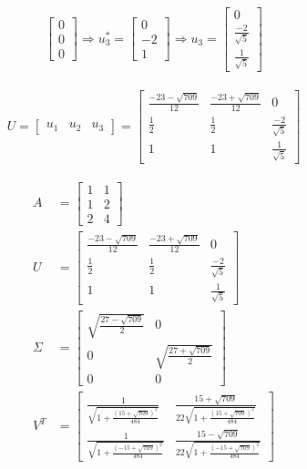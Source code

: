 \documentclass[a4paper, spanish]{article}
\begin{document}
\begin{align}
\begin{bmatrix}
        0 \\
        0 \\
        0
      \end{bmatrix}
      \Rightarrow
      u_3^* =
      \begin{bmatrix}
        0 \\
        -2 \\
        1
      \end{bmatrix}
      \Rightarrow
      u_3 =
      \begin{bmatrix}
        0 \\
        \frac{-2}{\sqrt{5}} \\
        \frac{1}{\sqrt{5}}
      \end{bmatrix}
    \end{align}

    \begin{align}
      U =
      \begin{bmatrix}
        u_1 & u_2 & u_3
      \end{bmatrix} =
      \begin{bmatrix}
        \frac{-23-\sqrt{709}}{12} & \frac{-23+\sqrt{709}}{12} & 0 \\
        \frac{1}{2} & \frac{1}{2} & \frac{-2}{\sqrt{5}} \\
        1 & 1 & \frac{1}{\sqrt{5}}
      \end{bmatrix}
    \end{align}


    \begin{align}
      A &=
      \begin{bmatrix}
        1 & 1\\
        1 & 2\\
        2 & 4
      \end{bmatrix} \\
      U &=
      \begin{bmatrix}
        \frac{-23-\sqrt{709}}{12} & \frac{-23+\sqrt{709}}{12} & 0 \\
        \frac{1}{2} & \frac{1}{2} & \frac{-2}{\sqrt{5}} \\
        1 & 1 & \frac{1}{\sqrt{5}}
      \end{bmatrix} \\
      \Sigma &=
      \begin{bmatrix}
        \sqrt{\frac{27 - \sqrt{709}}{2}} & 0 \\
        0 & \sqrt{\frac{27 + \sqrt{709}}{2}} \\
        0 & 0
      \end{bmatrix} \\
      V^T &=
      \begin{bmatrix}
        \frac{1}{\sqrt{1 + \frac{(15 + \sqrt{709})^2}{484}}} &  \frac{15 + \sqrt{709}}{22\sqrt{1 + \frac{(15 + \sqrt{709})^2}{484}}}  \\
        \frac{1}{\sqrt{1 + \frac{(- 15 + \sqrt{709})^2}{484}}} & \frac{15 - \sqrt{709}}{22\sqrt{1 + \frac{(- 15 + \sqrt{709})^2}{484}}}
      \end{bmatrix}
    \end{align}
\end{document}
